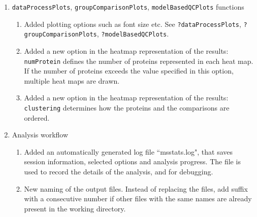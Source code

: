 \documentclass[10pt]{article}
\begin{document}
\begin{enumerate}
\item {\tt dataProcessPlots}, {\tt groupComparisonPlots}, {\tt modelBasedQCPlots} functions
	\begin{enumerate}
	\item Added plotting options such as font size etc. See {\tt ?dataProcessPlots}, {\tt ?groupComparisonPlots}, {\tt ?modelBasedQCPlots}.
	\item Added a new option in the heatmap representation of the results: {\tt numProtein} defines the number of proteins represented in each heat map. If the number of proteins exceeds the value specified in this option, multiple heat maps are drawn.
	\item  Added a new option in the heatmap representation of the results: {\tt clustering} determines how the proteins and the comparisons are ordered.
	\end{enumerate}

\item Analysis workflow
\begin{enumerate}
\item Added an automatically generated log file ``msstats.log", that saves session information, selected options and analysis progress. The file is used to record the details of the analysis, and for debugging.

\item New naming of the output files. Instead of replacing the files, add suffix with a consecutive number if other files with the same names are already present in the working directory.

\end{enumerate}


	
	
\end{enumerate}
\end{document}
